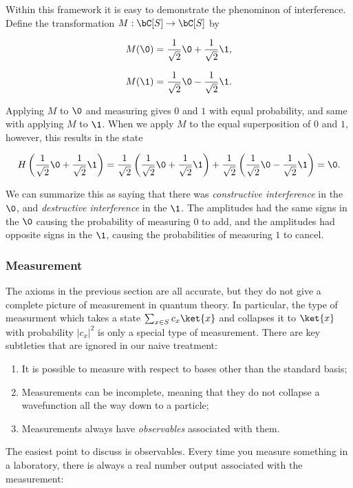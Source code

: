 \begin{rem}
Within this framework it is easy to demonstrate the phenominon of interference. Define the transformation $M: \bC[S]\to \bC[S]$ by

$$M(\0)=\frac{1}{\sqrt{2}}\0+\frac{1}{\sqrt{2}}\1,$$

$$M(\1)=\frac{1}{\sqrt{2}}\0-\frac{1}{\sqrt{2}}\1.$$

Applying $M$ to $\0$ and measuring gives $0$ and $1$ with equal probability, and same with applying $M$ to $\1$. When we apply $M$ to the equal superposition of $0$ and $1$, however, this results in the state

$$H\left(\frac{1}{\sqrt{2}}\0+\frac{1}{\sqrt{2}}\1\right)=\frac{1}{\sqrt{2}}\left(\frac{1}{\sqrt{2}}\0+\frac{1}{\sqrt{2}}\1\right)+\frac{1}{\sqrt{2}}\left(\frac{1}{\sqrt{2}}\0-\frac{1}{\sqrt{2}}\1\right)=\0.$$

We can summarize this as saying that there was {\em constructive interference} in the $\0$, and {\em destructive interference} in the $\1$. The amplitudes had the same signs in the $\0$ causing the probability of measuring $0$ to add, and the amplitudes had opposite signs in the $\1$, causing the probabilities of measuring $1$ to cancel.
\end{rem}

\subsubsection{Measurement}

The axioms in the previous section are all accurate, but they do not give a complete picture of measurement in quantum theory. In particular, the type of measurment which takes a state $\sum_{x\in S}c_x \ket{x}$ and collapses it to $\ket{x}$ with probability $|c_x|^2$ is only a special type of measurement. There are key subtleties that are ignored in our naive treatment:

\begin{enumerate}
\item It is possible to measure with respect to bases other than the standard basis;
\item Measurements can be incomplete, meaning that they do not collapse a wavefunction all the way down to a particle;
\item Measurements always have {\em observables} associated with them.
\end{enumerate}

The easiest point to discuss is observables. Every time you measure something in a laboratory, there is always a real number output associated with the measurement:

